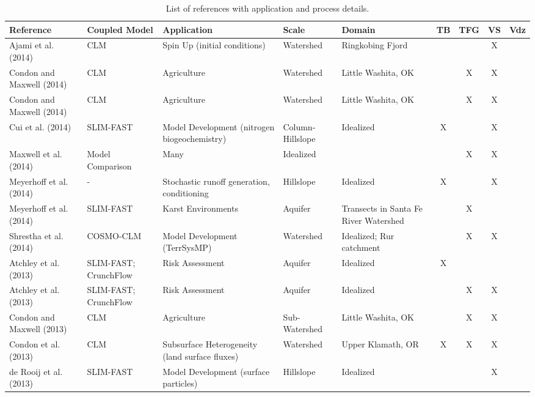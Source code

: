 {\scriptsize
\begin{table}
\renewcommand{\arraystretch}{2.5}
\center
\caption{List of \parflow{} references with application and process details.}
\begin{tabular}{ l  p{1.5cm} p{2cm} p{1.5cm} p{1.5cm} | c | c | c | c }
\bf{Reference} & \bf{Coupled Model} & \bf{Application} & \bf{Scale} & \bf{Domain} & \bf{TB} & \bf{TFG} & \bf{VS} & \bf{Vdz} \\ 
\hline{}

\cite{Ajami14} Ajami et al. (2014) & CLM & Spin Up (initial conditions) & Watershed & Ringkobing Fjord &   &   & X &     \\
\cite{Condon14a} Condon and Maxwell (2014) & CLM & Agriculture & Watershed & Little Washita, OK &   & X & X &     \\
\cite{Condon14b} Condon and Maxwell (2014) & CLM & Agriculture & Watershed & Little Washita, OK &  & X& X &     \\
\cite{Cui14} Cui et al. (2014) & SLIM-FAST & Model Development (nitrogen biogeochemistry) & Column-Hillslope & Idealized & X &   & X &     \\
\cite{M14} Maxwell et al. (2014) & Model Comparison & Many  & Idealized  &   &   & X & X &     \\ 
\cite{Meyerhoff14a} Meyerhoff et al. (2014) & - & Stochastic runoff generation, conditioning & Hillslope & Idealized & X &   & X &     \\
\cite{Meyerhoff14b} Meyerhoff et al. (2014) & SLIM-FAST & Karst Environments & Aquifer & Transects in Santa Fe River Watershed &   & X &   &       \\
\cite{Shrestha14} Shrestha et al. (2014) & COSMO-CLM & Model Development (TerrSysMP) & Watershed & Idealized; Rur catchment &   & X & X &     \\
\cite{Atchley13a} Atchley et al. (2013) & SLIM-FAST; CrunchFlow & Risk Assessment & Aquifer & Idealized & X &   &   &     \\ 
\cite{Atchley13b} Atchley et al. (2013) & SLIM-FAST; CrunchFlow & Risk Assessment & Aquifer & Idealized &   & X & X &     \\
\cite{Condon13a} Condon and Maxwell (2013) & CLM & Agriculture & Sub-Watershed & Little Washita, OK &   & X & X &     \\
\cite{Condon13b} Condon et al. (2013) & CLM & Subsurface Heterogeneity (land surface fluxes) & Watershed & Upper Klamath, OR & X & X & X &     \\
\cite{deRooij13} de Rooij et al. (2013) & SLIM-FAST & Model Development (surface particles) & Hillslope & Idealized  &   &   & X &     \\
\end{tabular}
\label{pfref1}
\end{table}

}
